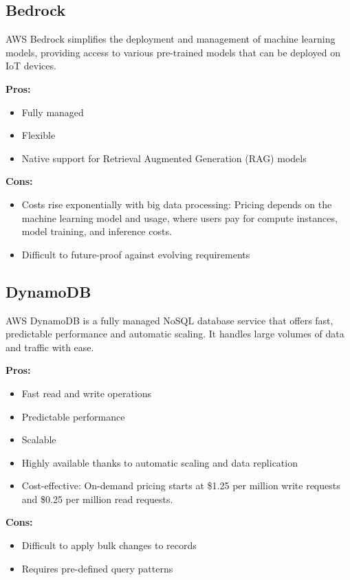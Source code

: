 \subsection*{Bedrock}
\label{aws:bedrock}
AWS Bedrock simplifies the deployment and management of machine learning models, providing access to various pre-trained models that can be deployed on IoT devices.

\textbf{Pros:}
\begin{itemize}
    \item Fully managed
    \item Flexible
    \item Native support for Retrieval Augmented Generation (RAG) models\cite{site:rag}
\end{itemize}

\textbf{Cons:}
\begin{itemize}
    \item Costs rise exponentially with big data processing: Pricing depends on the machine learning model and usage, where users pay for compute instances, model training, and inference costs.
    \item Difficult to future-proof against evolving requirements
\end{itemize}

\subsection*{DynamoDB}
\label{aws:dynamodb}
AWS DynamoDB is a fully managed NoSQL database service that offers fast, predictable performance and automatic scaling. It handles large volumes of data and traffic with ease.

\textbf{Pros:}
\begin{itemize}
    \item Fast read and write operations
    \item Predictable performance
    \item Scalable
    \item Highly available thanks to automatic scaling and data replication
    \item Cost-effective: On-demand pricing starts at \$1.25 per million write requests and \$0.25 per million read requests.
\end{itemize}

\textbf{Cons:}
\begin{itemize}
    \item Difficult to apply bulk changes to records
    \item Requires pre-defined query patterns
\end{itemize}

